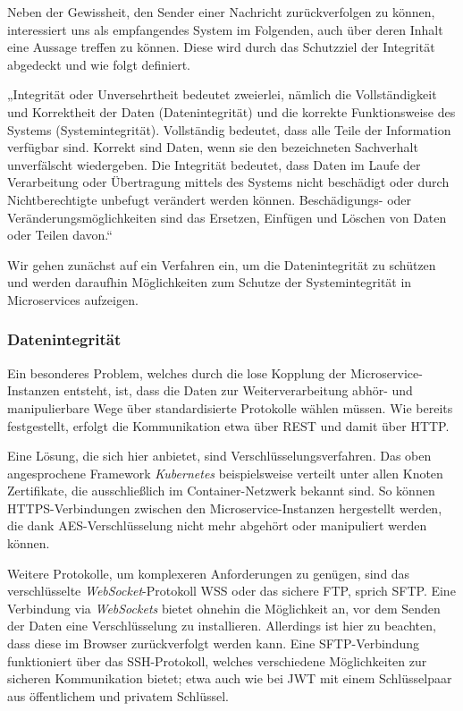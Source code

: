 Neben der Gewissheit, den Sender einer Nachricht zurückverfolgen zu können, interessiert uns als empfangendes System im Folgenden, auch über deren Inhalt eine Aussage treffen zu können. Diese wird durch das Schutzziel der Integrität abgedeckt und wie folgt definiert.

„Integrität oder Unversehrtheit bedeutet zweierlei, nämlich die Vollständigkeit und Korrektheit der Daten (Datenintegrität) und die korrekte Funktionsweise des Systems (Systemintegrität). Vollständig bedeutet, dass alle Teile der Information verfügbar sind. Korrekt sind Daten, wenn sie den bezeichneten Sachverhalt unverfälscht wiedergeben. Die Integrität bedeutet, dass Daten im Laufe der Verarbeitung oder Übertragung mittels des Systems nicht beschädigt oder durch Nichtberechtigte unbefugt verändert werden können. Beschädigungs- oder Veränderungsmöglichkeiten sind das Ersetzen, Einfügen und Löschen von Daten oder Teilen davon.“ \cite{Bedner+10}

Wir gehen zunächst auf ein Verfahren ein, um die Datenintegrität zu schützen und werden daraufhin Möglichkeiten zum Schutze der Systemintegrität in Microservices aufzeigen.

\subsubsection{Datenintegrität}

Ein besonderes Problem, welches durch die lose Kopplung der Microservice-Instanzen entsteht, ist, dass die Daten zur Weiterverarbeitung abhör- und manipulierbare Wege über standardisierte Protokolle wählen müssen. Wie bereits festgestellt, erfolgt die Kommunikation etwa über REST und damit über HTTP. 

Eine Lösung, die sich hier anbietet, sind Verschlüsselungsverfahren. Das oben angesprochene Framework \textit{Kubernetes} beispielsweise verteilt unter allen Knoten Zertifikate, die ausschließlich im Container-Netzwerk bekannt sind. So können HTTPS-Verbindungen zwischen den Microservice-Instanzen hergestellt werden, die dank AES-Verschlüsselung nicht mehr abgehört oder manipuliert werden können.

Weitere Protokolle, um komplexeren Anforderungen zu genügen, sind das verschlüsselte \textit{WebSocket}-Protokoll WSS oder das sichere FTP, sprich SFTP. Eine Verbindung via \textit{WebSockets} bietet ohnehin die Möglichkeit an, vor dem Senden der Daten eine Verschlüsselung zu installieren. Allerdings ist hier zu beachten, dass diese im Browser zurückverfolgt werden kann. Eine SFTP-Verbindung funktioniert über das SSH-Protokoll, welches verschiedene Möglichkeiten zur sicheren Kommunikation bietet; etwa auch wie bei JWT mit einem Schlüsselpaar aus öffentlichem und privatem Schlüssel.

